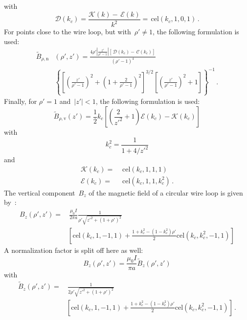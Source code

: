 with
\begin{equation}
  \mathcal{D}(k_c)
  = \frac{\mathcal{K}(k) - \,\mathcal{E}(k)}{k^2}
  = \,\mathrm{cel}(k_c, 1, 0, 1) \, . \label{eqn:elliptic_d}
\end{equation}
For points close to the wire loop, but with~$\rho' \neq 1$, the following formulation is used:
\begin{align}
  \tilde{B}_{\rho,\mathrm{n}}& (\rho', z')
  = \frac{4 \rho' \left|\frac{z'}{\rho'-1}\right| \left[ \,\mathcal{D}(k_c) - \,\mathcal{C}(k_c) \right]}
         {(\rho' - 1)^4} \nonumber \\
  ~& \left\{
      \left[ \left( \frac{z'}{\rho'-1} \right)^2 + \left(1 + \frac{2}{\rho'-1} \right)^2 \right]^{3/2}
      \left[ \left( \frac{z'}{\rho'-1} \right)^2 + 1 \right]
    \right\}^{-1} \label{eqn:cwl_B_rho_n} \, .
\end{align}
Finally, for $\rho'=1$ and~$|z'| < 1$, the following formulation is used:
\begin{equation}
  \tilde{B}_{\rho,\mathrm{v}} (z')
  = \frac{1}{2} k_c \left[ \left( \frac{2}{z'^2} + 1 \right) \mathcal{E}(k_c) - \mathcal{K}(k_c) \right] \label{eqn:cwl_B_rho_v}
\end{equation}
with
\begin{equation}
  k_c^2 = \frac{1}{1 + 4/{z'}^2}
\end{equation}
and
\begin{align}
  \mathcal{K}(k_c) =&\, \,\mathrm{cel}(k_c, 1, 1, 1) \\
  \mathcal{E}(k_c) =&\, \,\mathrm{cel}(k_c, 1, 1, k_c^2) \, .
\end{align}
The vertical component~$B_z$ of the magnetic field of a circular wire loop is given by~\cite{teal}:
\begin{align}
 B_z(\rho', z')
 =&\, \frac{\mu_0 I}{2 \pi a}
   \frac{1}{\rho' \sqrt{z'^2 + (1 + \rho')^2}} \nonumber \\
 ~& \left[
       \textrm{cel}(k_c, 1, -1, 1)
     + \frac{1 + k_c^2 - \left( 1 - k_c^2 \right) \rho'}{2} \textrm{cel}(k_c, k_c^2, -1, 1)
   \right]
\end{align}
A normalization factor is split off here as well:
\begin{equation}
  B_z(\rho', z') = \frac{\mu_0 I}{\pi a} \tilde{B}_z(\rho', z')
\end{equation}
with
\begin{align}
  \tilde{B}_z(\rho', z')
  =&\, \frac{1}{2 \rho' \sqrt{z'^2 + (1 + \rho')^2}} \nonumber \\
 ~& \left[
       \textrm{cel}(k_c, 1, -1, 1)
     + \frac{1 + k_c^2 - \left( 1 - k_c^2 \right) \rho'}{2} \textrm{cel}(k_c, k_c^2, -1, 1)
   \right] \, .
\end{align}
